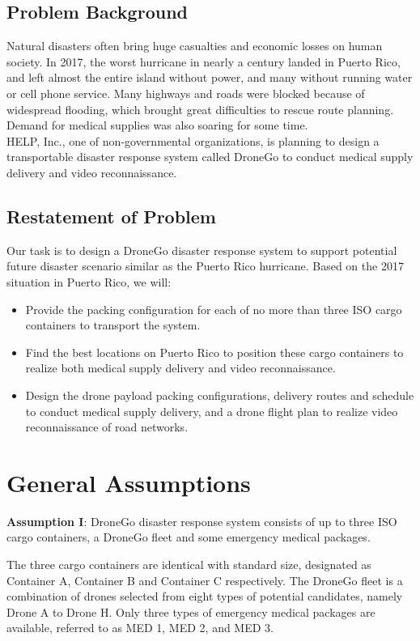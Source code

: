 \documentclass{mcmthesis}
\begin{document}
\subsection{Problem Background}
Natural disasters often bring huge casualties and economic losses on human society. In 2017, the worst hurricane in nearly a century landed in Puerto Rico, and left almost the entire island without power, and many without running water or cell phone service. Many highways and roads were blocked because of widespread flooding, which brought great difficulties to rescue route planning. Demand for medical supplies was also soaring for some time. \\

\noindent HELP, Inc., one of non-governmental organizations, is planning to design a transportable disaster response system called DroneGo to conduct medical supply delivery and video reconnaissance.

\subsection{Restatement of Problem}

Our task is to design a DroneGo disaster response system to support potential future disaster scenario similar as the Puerto Rico hurricane. Based on the 2017 situation in Puerto Rico, we will: 

\begin{itemize}
	\item Provide the packing configuration for each of no more than three ISO cargo containers to transport the system.
	\item Find the best locations on Puerto Rico to position these cargo containers to realize both medical supply delivery and video reconnaissance.
	\item Design the drone payload packing configurations, delivery routes and schedule to conduct medical supply delivery, and a drone flight plan to realize video reconnaissance of road networks.
\end{itemize}



\section{General Assumptions}
\textbf{Assumption I}: DroneGo disaster response system consists of up to three ISO cargo containers, a DroneGo fleet and some emergency medical packages. 

\noindent The three cargo containers are identical with standard size, designated as Container A, Container B and Container C respectively. The DroneGo fleet is a combination of drones selected from eight types of potential candidates, namely Drone A to Drone H. Only three types of emergency medical packages are available, referred to as MED 1, MED 2, and MED 3.
\end{document}

